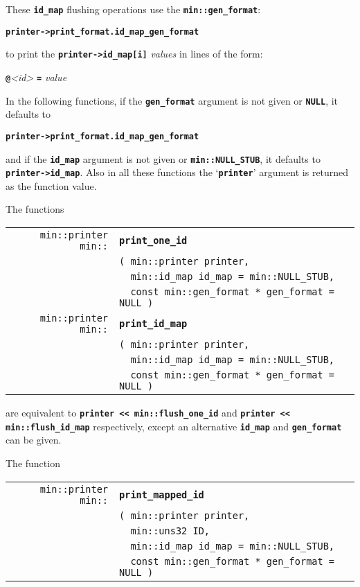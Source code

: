 \documentclass[12pt]{article}
\makeatletter
\newcommand{\TT}[1]{{\tt \bfseries #1}}
\newcommand{\ttindex}[1]{\index{#1@{\tt #1}}}
\newcommand{\EOL}{\penalty \exhyphenpenalty}
\newenvironment{indpar}[1][0.3in]%
	{\begin{list}{}%
		     {\setlength{\itemsep}{0in}%
		      \setlength{\topsep}{0in}%
		      \setlength{\parsep}{1ex}%
		      \setlength{\labelwidth}{#1}%
		      \setlength{\leftmargin}{#1}%
		      \addtolength{\leftmargin}{\labelsep}}%
	 \item}%
	{\end{list}}
\newcommand{\LABEL}[1]{\label{#1}}
\newlength{\ARGBREAKLENGTH}
\newcommand{\ARGBREAK}[1][\ARGBREAKLENGTH]{\\&\hspace*{#1}}
\newcommand{\MINKEY}[1]%
	   {\TT{#1}\ttindex{min::#1}\ttindex{#1}}
\makeatother
\begin{document}
These \TT{id\_map} flushing operations use the \TT{min::gen\_\EOL format}:
\begin{center}
\TT{printer->\EOL print\_\EOL format.id\_\EOL map\_\EOL gen\_\EOL format}
\end{center}
to print the \TT{printer->id\_map[i]} {\em values} in lines of the form:
\begin{center}
\TT{@}{\em <id>} \TT{=} {\em value}
\end{center}

In the following functions,
if the \TT{gen\_format} argument is not given or \TT{NULL},
it defaults to
\begin{center}
\TT{printer->\EOL print\_\EOL format.id\_\EOL map\_\EOL gen\_\EOL format}
\end{center}
and if the \TT{id\_map} argument is not given or \TT{min::\EOL NULL\_\EOL STUB},
it defaults to \TT{printer->\EOL id\_\EOL map}.
Also in all these functions the `\TT{printer}' argument is returned as the
function value.

The functions

\begin{indpar}[1em]\begin{tabular}{r@{}l}
\verb|min::printer min::| & \MINKEY{print\_one\_id}
\LABEL{MIN::PRINT_ONE_ID}\ARGBREAK
    \verb|( min::printer printer,|\ARGBREAK
    \verb|  min::id_map id_map = min::NULL_STUB,|\ARGBREAK
    \verb|  const min::gen_format * gen_format = NULL )| \\
\verb|min::printer min::| & \MINKEY{print\_id\_map}
\LABEL{MIN::PRINT_ID_MAP}\ARGBREAK
    \verb|( min::printer printer,|\ARGBREAK
    \verb|  min::id_map id_map = min::NULL_STUB,|\ARGBREAK
    \verb|  const min::gen_format * gen_format = NULL )| \\
\end{tabular}\end{indpar}

are equivalent to \TT{printer <{}< min::flush\_one\_id}
and \TT{printer <{}< min::\EOL flush\_\EOL id\_\EOL map} respectively,
except an alternative \TT{id\_map} and \TT{gen\_\EOL format}
can be given.

The function

\begin{indpar}[1em]\begin{tabular}{r@{}l}
\verb|min::printer min::| & \MINKEY{print\_mapped\_id}
\LABEL{MIN::PRINT_MAPPED_ID}\ARGBREAK
    \verb|( min::printer printer,|\ARGBREAK
    \verb|  min::uns32 ID,|\ARGBREAK
    \verb|  min::id_map id_map = min::NULL_STUB,|\ARGBREAK
    \verb|  const min::gen_format * gen_format = NULL )| \\
\end{tabular}\end{indpar}
\end{document}
